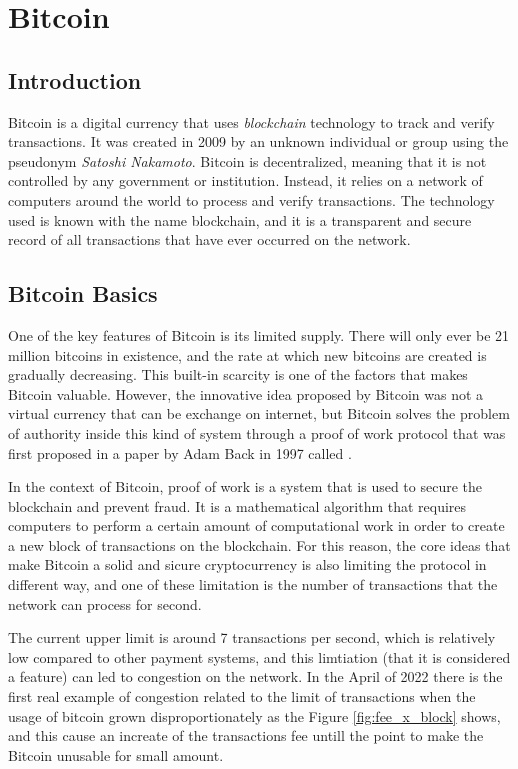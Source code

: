 \setcounter{page}{1}
\chapter{Bitcoin}

\section{Introduction}

Bitcoin is a digital currency that uses \emph{blockchain} technology to track
and verify transactions. It was created in 2009 by an unknown individual or
group using the pseudonym \emph{Satoshi Nakamoto}.
Bitcoin is decentralized, meaning that it is not controlled by any government
or institution. Instead, it relies on a network of computers around the world
to process and verify transactions.
The technology used is known with the name blockchain, and it is a transparent
and secure record of all transactions that have
ever occurred on the network.

\section{Bitcoin Basics}
\label{sec:basics}

One of the key features of Bitcoin is its limited supply. There will only ever
be 21 million bitcoins in existence, and the rate at which new bitcoins are
created is gradually decreasing. This built-in scarcity is one of the factors
that makes Bitcoin valuable.
However, the innovative idea proposed by Bitcoin was not a virtual currency that can be
exchange on internet, but Bitcoin solves the problem of authority inside this kind
of system through a proof of work protocol that was first proposed in a paper
by Adam Back in 1997 called .

In the context of Bitcoin, proof of work is a system that is used to secure the
blockchain and prevent fraud. It is a mathematical algorithm that requires computers
to perform a certain amount of computational work in order to create a new
block of transactions on the blockchain.
For this reason, the core ideas that make Bitcoin a solid and sicure cryptocurrency 
is also limiting the protocol in different way, and one of these limitation is the number of
transactions that the network can process for second.

The current upper limit is around 7 transactions per second, 
which is relatively low compared to other payment systems, and 
this limtiation (that it is considered a feature) can led to congestion
on the network. 
In the April of 2022 there is the first real example of congestion 
related to the limit of transactions when the usage of bitcoin
grown disproportionately as the Figure \ref{fig:fee_x_block} shows, and this
cause an increate of the transactions fee untill the point to make 
the Bitcoin unusable for small amount.

